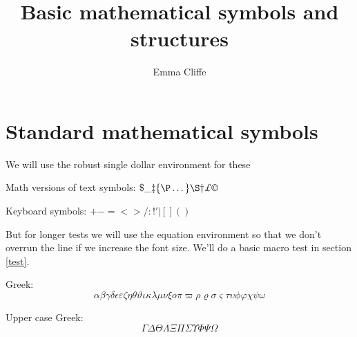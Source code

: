 


\title{Basic mathematical symbols and structures}
\author{Emma Cliffe}
\date{}

\usepackage{calc}
\usepackage{longtable}
\usepackage{tabu}
\usepackage{breqn}
\setlength{\arraycolsep}{0.800000em}
\renewcommand{\arraystretch}{1.400000}

\renewcommand{\baselinestretch}{1.250000}
\selectfont
\setlength{\parskip}{1.0\baselineskip}


\maketitle
\tableofcontents
{}

\section{Standard mathematical symbols}

We will use the robust single dollar environment for these

Math versions of text symbols: \(\$  \_  \ddag  \{  \P  \dots  \}  \S  \dag  \pounds \copyright\)

Keyboard symbols: \(+  -  =  <  >  /  :  !  '  |  [  ]  (  )\)

\noindent 
But for longer tests we will use the equation environment so that we don't overrun the line if we increase the font size. We'll do a basic macro test in section \ref{test}.

Greek:
\begin{dmath}[compact,spread={1.250000\baselineskip}] \alpha  \beta  \gamma  \delta  \epsilon  \varepsilon  \zeta  \eta  \theta  \vartheta  \iota  \kappa  \lambda  \mu  \nu  \xi  o  \pi  \varpi  \rho  \varrho  \sigma  \varsigma  \tau  \upsilon  \phi  \varphi  \chi  \psi  \omega \end{dmath}

Upper case Greek:
\begin{dmath}[compact,spread={1.250000\baselineskip}] \Gamma  \Delta  \Theta  \Lambda  \Xi  \Pi  \Sigma  \Upsilon  \Phi  \Psi  \Omega \end{dmath}

